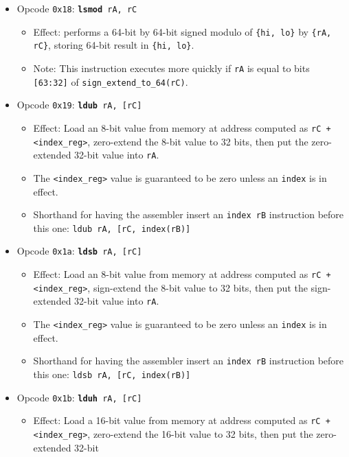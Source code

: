 \documentclass{article}
\begin{document}
\begin{itemize}
\begin{itemize}
		\end{itemize}
		\item Opcode \texttt{0x18}:
			\texttt{\textbf{lsmod} rA, rC}
		\begin{itemize}
			\item Effect:  performs a 64-bit by 64-bit signed modulo of
			\texttt{\{hi, lo\}} by \texttt{\{rA, rC\}}, storing 64-bit
			result in \texttt{\{hi, lo\}}.
			\item Note:  This instruction executes more quickly if
			\texttt{rA} is equal to bits \texttt{[63:32]} of
			\texttt{sign\_extend\_to\_64(rC)}.
		\end{itemize}
		\item Opcode \texttt{0x19}:
			\texttt{\textbf{ldub} rA, [rC]}
		\begin{itemize}
			\item Effect:  Load an 8-bit value from memory at address
			computed as \texttt{rC + <index\_reg>}, zero-extend
			the 8-bit value to 32 bits, then put the zero-extended 32-bit
			value into \texttt{rA}.
			\item The \texttt{<index\_reg>} value is guaranteed to be zero
			unless an \texttt{index} is in effect.
			\item Shorthand for having the assembler insert an
			\texttt{index rB} instruction before this one:
				\texttt{ldub rA, [rC, index(rB)]}
		\end{itemize}
		\item Opcode \texttt{0x1a}:
			\texttt{\textbf{ldsb} rA, [rC]}
		\begin{itemize}
			\item Effect:  Load an 8-bit value from memory at address
			computed as \texttt{rC + <index\_reg>}, sign-extend
			the 8-bit value to 32 bits, then put the sign-extended 32-bit
			value into \texttt{rA}.
			\item The \texttt{<index\_reg>} value is guaranteed to be zero
			unless an \texttt{index} is in effect.
			\item Shorthand for having the assembler insert an
			\texttt{index rB} instruction before this one:
				\texttt{ldsb rA, [rC, index(rB)]}
		\end{itemize}
		\item Opcode \texttt{0x1b}:
			\texttt{\textbf{lduh} rA, [rC]}
		\begin{itemize}
			\item Effect:  Load a 16-bit value from memory at address
			computed as \texttt{rC + <index\_reg>}, zero-extend
			the 16-bit value to 32 bits, then put the zero-extended 32-bit

\end{itemize}
\end{itemize}
\end{document}
